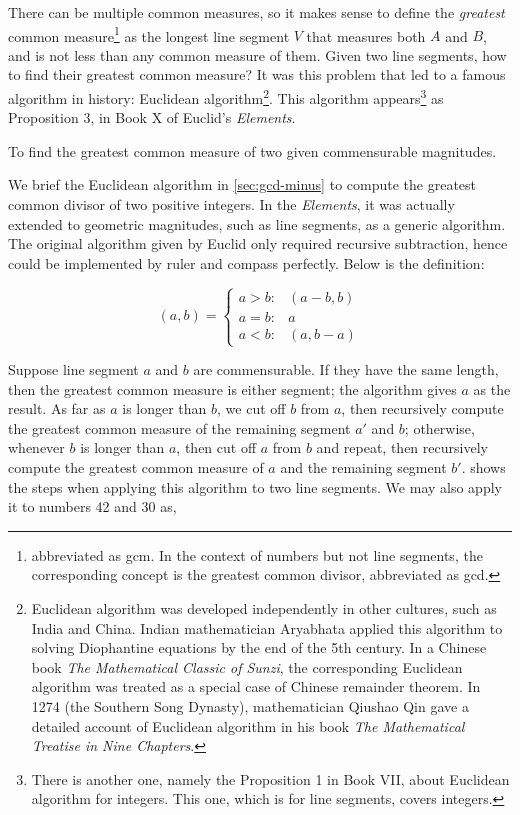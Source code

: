 \documentclass[b5paper]{article}
\begin{document}
There can be multiple common measures, so it makes sense to define the \emph{greatest} common measure\footnote{abbreviated as gcm. In the context of numbers but not line segments, the corresponding concept is the greatest common divisor, abbreviated as gcd.} as the longest line segment $V$ that measures both $A$ and $B$, and is not less than any common measure of them. Given two line segments, how to find their greatest common measure? It was this problem that led to a famous algorithm in history: Euclidean algorithm\footnote{Euclidean algorithm was developed independently in other cultures, such as India and China. Indian mathematician Aryabhata applied this algorithm to solving Diophantine equations by the end of the 5th century. In a Chinese book \emph{The Mathematical Classic of Sunzi}, the corresponding Euclidean algorithm was treated as a special case of Chinese remainder theorem. In 1274 (the Southern Song Dynasty), mathematician Qiushao Qin gave a detailed account of Euclidean algorithm in his book \emph{The Mathematical Treatise in Nine Chapters}.}. This algorithm appears\footnote{There is another one, namely the Proposition 1 in Book VII, about Euclidean algorithm for integers. This one, which is for line segments, covers integers.} as Proposition 3, in Book X of Euclid's \emph{Elements}.

\begin{proposition}
To find the greatest common measure of two given commensurable magnitudes.
\end{proposition}

We brief the Euclidean algorithm in \cref{sec:gcd-minus} to compute the greatest common divisor of two positive integers. In the \emph{Elements}, it was actually extended to geometric magnitudes, such as line segments, as a generic algorithm. The original algorithm given by Euclid only required recursive subtraction, hence could be implemented by ruler and compass perfectly. Below is the definition:

\[
(a, b) = \begin{cases}
  a > b :& (a - b, b) \\
  a = b :& a \\
  a < b :& (a, b - a)
  \end{cases}
\]

Suppose line segment $a$ and $b$ are commensurable. If they have the same length, then the greatest common measure is either segment; the algorithm gives $a$ as the result. As far as $a$ is longer than $b$, we cut off $b$ from $a$, then recursively compute the greatest common measure of the remaining segment $a'$ and $b$; otherwise, whenever $b$ is longer than $a$, then cut off $a$ from $b$ and repeat, then recursively compute the greatest common measure of $a$ and the remaining segment $b'$.  shows the steps when applying this algorithm to two line segments. We may also apply it to numbers 42 and 30 as,
\end{document}
